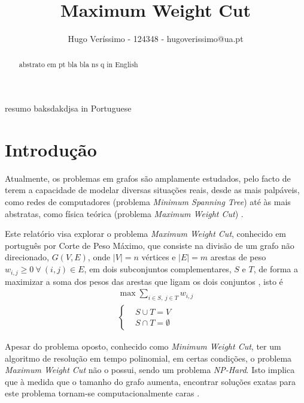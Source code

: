 \documentclass[mirror]{revdetua}
\begin{document}

\title{Maximum Weight Cut}
\author{Hugo Veríssimo - 124348 - hugoverissimo@ua.pt}
\maketitle

\begin{abstract}
abstrato em pt bla bla ns q in English
\end{abstract}

\begin{resumo}
resumo baksdakdjsa in Portuguese
\end{resumo}

\section{Introdução}

Atualmente, os problemas em grafos são amplamente estudados, pelo facto de terem a capacidade de modelar diversas situações reais, desde as mais palpáveis, como redes de computadores (problema \textit{Minimum Spanning Tree}) até às mais abstratas, como física teórica (problema \textit{Maximum Weight Cut}) \cite{WP24}.

Este relatório visa explorar o problema \textit{Maximum Weight Cut}, conhecido em português por Corte de Peso Máximo, que consiste na divisão de um grafo não direcionado, $G(V, E)$, onde $|V| = n$ vértices e $|E| = m$ arestas de peso $w_{i,j} \geq 0\ \forall\ (i,j) \in E$, em dois subconjuntos complementares, $S$ e $T$, de forma a maximizar a soma dos pesos das arestas que ligam os dois conjuntos \cite{SC03}, isto é
\begin{equation*}
    \begin{split}
        \max \sum_{i \in S,\ j \in T} w_{i,j} \\ 
        \left\{\begin{split}
            &S \cup T = V \\
            &S \cap T = \emptyset
        \end{split}\right.
    \end{split}
\end{equation*}

Apesar do problema oposto, conhecido como \textit{Minimum Weight Cut}, ter um algoritmo de resolução em tempo polinomial, em certas condições, o problema \textit{Maximum Weight Cut} não o possui, sendo um problema \textit{NP-Hard}. Isto implica que à medida que o tamanho do grafo aumenta, encontrar soluções exatas para este problema tornam-se computacionalmente caras \cite{WP24}.
\end{document}
